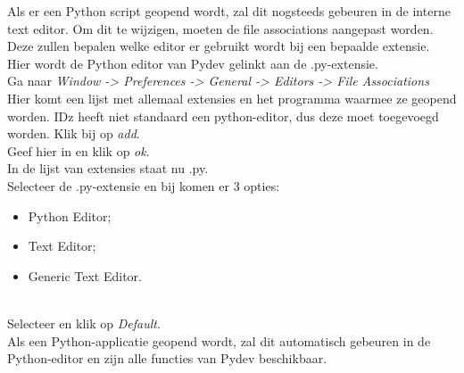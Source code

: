 Als er een Python script geopend wordt, zal dit nogsteeds gebeuren in de interne text editor. Om dit te wijzigen, moeten de file associations aangepast worden. Deze zullen bepalen welke editor er gebruikt wordt bij een bepaalde extensie. Hier wordt de Python editor van Pydev gelinkt aan de .py-extensie. \\

Ga naar \textit{Window -> Preferences -> General -> Editors -> File Associations} \\

Hier komt een lijst met allemaal extensies en het programma waarmee ze geopend worden. IDz heeft niet standaard een python-editor, dus deze moet toegevoegd worden. Klik bij  op \textit{add}. \\

Geef hier  in en klik op \textit{ok}. \\

In de lijst van extensies staat nu .py. \\

Selecteer de .py-extensie en bij  komen er 3 opties:
\begin{itemize}
    \item Python Editor;
    \item Text Editor;
    \item Generic Text Editor.
\end{itemize}
\\
Selecteer  en klik op \textit{Default}. \\


Als een Python-applicatie geopend wordt, zal dit automatisch gebeuren in de Python-editor en zijn alle functies van Pydev beschikbaar.



